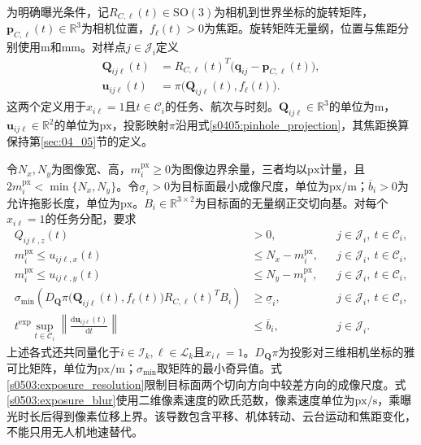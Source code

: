 为明确曝光条件，记$R_{C,\ell}(t)\in\mathrm{SO}(3)$为相机到世界坐标的旋转矩阵，$\mathbf p_{C,\ell}(t)\in\mathbb R^3$为相机位置，$f_\ell(t)>0$为焦距。旋转矩阵无量纲，位置与焦距分别使用$\mathrm m$和$\mathrm{mm}$。对样点$j\in\mathcal J_i$定义
\begin{align}
 \mathbf Q_{ij\ell}(t)
 &=R_{C,\ell}(t)^T
   \bigl(\mathbf q_{ij}-\mathbf p_{C,\ell}(t)\bigr),
 \label{s0503:camera_sample}\\
 \mathbf u_{ij\ell}(t)
 &=\pi\bigl(\mathbf Q_{ij\ell}(t),f_\ell(t)\bigr).
 \label{s0503:sample_pixel}
\end{align}
这两个定义用于$x_{i\ell}=1$且$t\in\mathcal C_i$的任务、航次与时刻。$\mathbf Q_{ij\ell}\in\mathbb R^3$的单位为$\mathrm m$，$\mathbf u_{ij\ell}\in\mathbb R^2$的单位为$\mathrm{px}$，投影映射$\pi$沿用式\eqref{s0405:pinhole_projection}，其焦距换算保持第\ref{sec:04_05}节的定义。

令$N_x,N_y$为图像宽、高，$m_i^{\mathrm{px}}\ge0$为图像边界余量，三者均以$\mathrm{px}$计量，且$2m_i^{\mathrm{px}}<\min\{N_x,N_y\}$。令$\underline\sigma_i>0$为目标面最小成像尺度，单位为$\mathrm{px/m}$；$\overline b_i>0$为允许拖影长度，单位为$\mathrm{px}$。$B_i\in\mathbb R^{3\times2}$为目标面的无量纲正交切向基。对每个$x_{i\ell}=1$的任务分配，要求
\begin{align}
 Q_{ij\ell,z}(t)&>0,
 &&j\in\mathcal J_i,\ t\in\mathcal C_i,
 \label{s0503:exposure_depth}\\
 m_i^{\mathrm{px}}\le u_{ij\ell,x}(t)
 &\le N_x-m_i^{\mathrm{px}},
 &&j\in\mathcal J_i,\ t\in\mathcal C_i,
 \label{s0503:exposure_horizontal}\\
 m_i^{\mathrm{px}}\le u_{ij\ell,y}(t)
 &\le N_y-m_i^{\mathrm{px}},
 &&j\in\mathcal J_i,\ t\in\mathcal C_i,
 \label{s0503:exposure_vertical}\\
 \sigma_{\min}\!\left(
 D_{\mathbf Q}\pi\bigl(\mathbf Q_{ij\ell}(t),f_\ell(t)\bigr)
 R_{C,\ell}(t)^TB_i\right)
 &\ge\underline\sigma_i,
 &&j\in\mathcal J_i,\ t\in\mathcal C_i,
 \label{s0503:exposure_resolution}\\
 t^{\mathrm{exp}}\sup_{t\in\mathcal C_i}
 \left\|\frac{\mathrm d\mathbf u_{ij\ell}(t)}{\mathrm dt}\right\|
 &\le\overline b_i,
 &&j\in\mathcal J_i.
 \label{s0503:exposure_blur}
\end{align}
上述各式还共同量化于$i\in\mathcal I_k,\ell\in\mathcal L_k$且$x_{i\ell}=1$。$D_{\mathbf Q}\pi$为投影对三维相机坐标的雅可比矩阵，单位为$\mathrm{px/m}$；$\sigma_{\min}$取矩阵的最小奇异值。式\eqref{s0503:exposure_resolution}限制目标面两个切向方向中较差方向的成像尺度。式\eqref{s0503:exposure_blur}使用二维像素速度的欧氏范数，像素速度单位为$\mathrm{px/s}$，乘曝光时长后得到像素位移上界。该导数包含平移、机体转动、云台运动和焦距变化，不能只用无人机地速替代。

